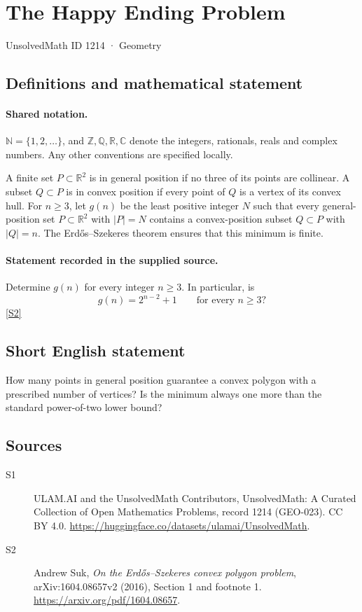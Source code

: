 \documentclass[11pt]{article}
\newcommand{\sref}[2]{\hyperlink{source:#1:#2}{[S#2]}}
\begin{document}
\setcounter{section}{1213}
\section{The Happy Ending Problem}\label{1214}
{\small\sffamily UnsolvedMath ID 1214 · Geometry}
\subsection{Definitions and mathematical statement}

\paragraph{Shared notation.}$\mathbb N=\{1,2,\ldots\}$, and $\mathbb Z,\mathbb Q,\mathbb R,\mathbb C$ denote the integers, rationals, reals and complex numbers. Any other conventions are specified locally.


A finite set $P\subset\mathbb R^2$ is in general position if no three of its points are collinear. A subset $Q\subset P$ is in convex position if every point of $Q$ is a vertex of its convex hull. For $n\geq3$, let $g(n)$ be the least positive integer $N$ such that every general-position set $P\subset\mathbb R^2$ with $|P|=N$ contains a convex-position subset $Q\subset P$ with $|Q|=n$. The Erd\H{o}s--Szekeres theorem ensures that this minimum is finite.
\paragraph{Statement recorded in the supplied source.}
Determine $g(n)$ for every integer $n\geq3$. In particular, is
\[
g(n)=2^{n-2}+1\qquad\text{for every }n\geq3?
\] \sref{1214}{2}

\subsection{Short English statement}
How many points in general position guarantee a convex polygon with a prescribed number of vertices? Is the minimum always one more than the standard power-of-two lower bound?
\subsection{Sources}
\begin{description}
\item[\hypertarget{source:1214:1}{S1}] ULAM.AI and the UnsolvedMath Contributors, UnsolvedMath: A Curated Collection of Open Mathematics Problems, record 1214 (GEO-023). CC BY 4.0. \url{https://huggingface.co/datasets/ulamai/UnsolvedMath}.
\item[\hypertarget{source:1214:2}{S2}] Andrew Suk, \emph{On the Erd\H{o}s--Szekeres convex polygon problem}, arXiv:1604.08657v2 (2016), Section 1 and footnote 1. \url{https://arxiv.org/pdf/1604.08657}.
\end{description}
\label{end:1214}
\end{document}
